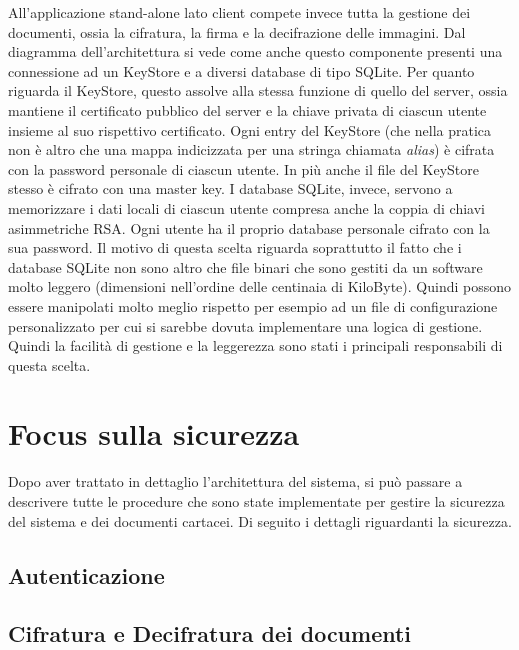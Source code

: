 All'applicazione stand-alone lato client compete invece tutta la gestione dei documenti, ossia la cifratura, la firma e la decifrazione delle immagini. Dal diagramma dell'architettura si vede come anche questo componente presenti una connessione ad un KeyStore e a diversi database di tipo SQLite. Per quanto riguarda il KeyStore, questo assolve alla stessa funzione di quello del server, ossia mantiene il certificato pubblico del server e la chiave privata di ciascun utente insieme al suo rispettivo certificato. Ogni entry del KeyStore (che nella pratica non è altro che una mappa indicizzata per una stringa chiamata \emph{alias}) è cifrata con la password personale di ciascun utente. In più anche il file del KeyStore stesso è cifrato con una master key.
I database SQLite, invece, servono a memorizzare i dati locali di ciascun utente compresa anche la coppia di chiavi asimmetriche RSA. Ogni utente ha il proprio database personale cifrato con la sua password.
Il motivo di questa scelta riguarda soprattutto il fatto che i database SQLite non sono altro che file binari che sono gestiti da un software molto leggero (dimensioni nell'ordine delle centinaia di KiloByte). Quindi possono essere manipolati molto meglio rispetto per esempio ad un file di configurazione personalizzato per cui si sarebbe dovuta implementare una logica di gestione.
Quindi la facilità di gestione e la leggerezza sono stati i principali responsabili di questa scelta.

\section{Focus sulla sicurezza}
	\label{sec:sicurezza}
Dopo aver trattato in dettaglio l'architettura del sistema, si può passare a descrivere tutte le procedure che sono state implementate per gestire la sicurezza del sistema e dei documenti cartacei. Di seguito i dettagli riguardanti la sicurezza.

\subsection{Autenticazione}
	\label{subsec:autenticazione}
	
\subsection{Cifratura e Decifratura dei documenti}
	\label{subsec:documenti}
